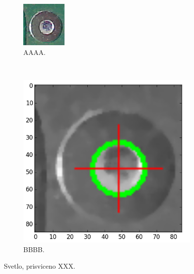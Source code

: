 \begin{figure}[h!]
	\centering
	\begin{subfigure}[b]{0.4\textwidth}
		\centering
		\includegraphics[width=0.4\linewidth, trim = 0cm -1.5cm 0cm 0cm]{obrazky/fiduc_svetlo_prisviceno_crop.png}%
		\caption{AAAA.}
		\label{fig:svetlo}
	\end{subfigure}
	~
	\begin{subfigure}[b]{0.4\textwidth}
		\centering
		\includegraphics[width=0.9\linewidth]{obrazky/fiduc_svetlo_prisviceno_crop3.png}%
		\caption{BBBB.}
		\label{fig:svetlo2}
	\end{subfigure}

	\caption{Svetlo, prisviceno XXX.}
\end{figure}


